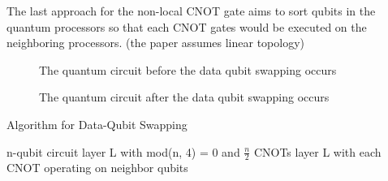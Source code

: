 The last approach for the non-local CNOT gate aims to sort qubits in the quantum processors so that each CNOT gates would be executed on the neighboring processors. (the paper \cite{distributedquantumcompiler} assumes linear topology)

\begin{figure}[ht]
  	\begin{center}

		\caption{The quantum circuit before the data qubit swapping occurs}
	\end{center}
\end{figure}
	
\begin{figure}[ht]
  	\begin{center}
		\caption{The quantum circuit after the data qubit swapping occurs}
	\end{center}
\end{figure}	

\begin{algorithm}
 \caption{Algorithm for Data-Qubit Swapping}
 \begin{algorithmic}[1]
  \Require n-qubit circuit layer L with mod(n, 4) = 0 and $\frac{n}{2}$ CNOTs
  \Ensure  layer L with each CNOT operating on neighbor qubits
    \Else
    \EndIf
    
    \EndIf
    
\EndFunction

 \end{algorithmic} 
 \end{algorithm}

